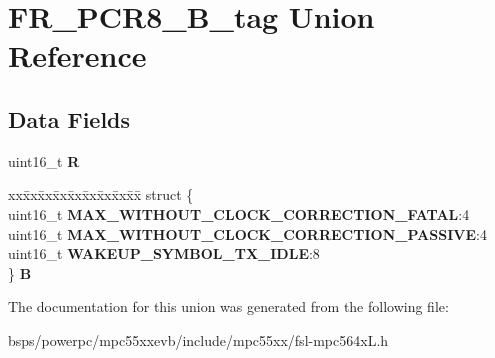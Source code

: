 \hypertarget{unionFR__PCR8__16B__tag}{}\section{F\+R\+\_\+\+P\+C\+R8\+\_\+B\+\_\+tag Union Reference}
\label{unionFR__PCR8__16B__tag}
\subsection*{Data Fields}
\begin{DoxyCompactItemize}
\item 
\mbox{\label{unionFR__PCR8__16B__tag_a3f9b938ed9d3d97d3d39a38872831dc2}} 
uint16\+\_\+t {\bfseries R}
\item 
\mbox{\label{unionFR__PCR8__16B__tag_abb00533944419a720cb817a360dffe6d}} 
\begin{tabbing}
xx\=xx\=xx\=xx\=xx\=xx\=xx\=xx\=xx\=\kill
struct \{\\
\>uint16\_t {\bfseries MAX\_WITHOUT\_CLOCK\_CORRECTION\_FATAL}:4\\
\>uint16\_t {\bfseries MAX\_WITHOUT\_CLOCK\_CORRECTION\_PASSIVE}:4\\
\>uint16\_t {\bfseries WAKEUP\_SYMBOL\_TX\_IDLE}:8\\
\} {\bfseries B}\\

\end{tabbing}\end{DoxyCompactItemize}


The documentation for this union was generated from the following file\+:\begin{DoxyCompactItemize}
\item 
bsps/powerpc/mpc55xxevb/include/mpc55xx/fsl-\/mpc564x\+L.\+h\end{DoxyCompactItemize}
